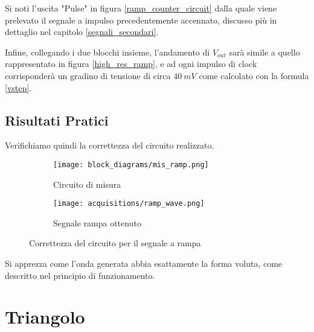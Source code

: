 Si noti l'uscita "Pulse" in figura \ref{ramp_counter_circuit} dalla quale viene prelevato
il segnale a impulso precedentemente accennato, discusso più in dettaglio nel capitolo
\ref{segnali_secondari}.

Infine, collegando i due blocchi insieme, l'andamento di $V_{out}$ sarà simile a quello
rappresentato in figura \ref{high_res_ramp}, e ad ogni impulso di clock corrisponderà un
gradino di tensione di circa $40\ mV$ come calcolato con la formula \ref{vstep}.


\subsection*{Risultati Pratici}


Verifichiamo quindi la correttezza del circuito realizzato.

\begin{figure}[H]
    \centering

    \begin{subfigure}{.5\textwidth}
        \centering
        \texttt{[image: block\_diagrams/mis\_ramp.png]}
        \caption{Circuito di misura}
        \label{mis_ramp}
    \end{subfigure}%
    \begin{subfigure}{.5\textwidth}
        \centering
        \texttt{[image: acquisitions/ramp\_wave.png]}
        \caption{Segnale rampa ottenuto}
        \label{acq_ramp}
    \end{subfigure}

    \caption{Correttezza del circuito per il segnale a rampa}
    \label{acq_ramp_signals}
\end{figure}

Si apprezza come l'onda generata abbia esattamente la forma voluta, come descritto nel
principio di funzionamento.


\section{Triangolo}


